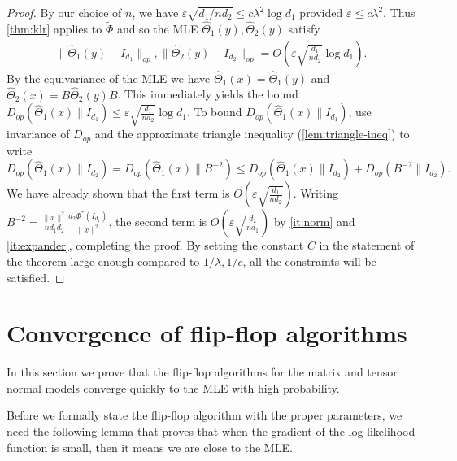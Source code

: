 \documentclass[aos]{imsart}
\theoremstyle{definition}
\numberwithin{equation}{section}
\newcommand{\htheta}{\widehat{\Theta}}
\newcommand{\eps}{\varepsilon}
\begin{document}
\begin{proof}
By our choice of $n$, we have $\eps \sqrt{d_1/nd_2} \leq c\lambda^2\log d_1$ provided $\eps \leq c\lambda^2$. Thus \cref{thm:klr} applies to $\tilde{\Phi}$ and so the MLE $\htheta_1(y), \htheta_2(y)$ satisfy
\begin{gather*} \| \htheta_1(y) - I_{d_1}\|_{op}, \| \htheta_2(y) - I_{d_2}\|_{op} = O\left(\eps \sqrt{\frac{d_1}{n d_2}} \log d_1\right).\end{gather*}
By the equivariance of the MLE we have $\htheta_1(x) = \htheta_1(y)$ and $\htheta_2(x) = B \htheta_2 (y) B$. This immediately yields the bound $ D_{op}(\htheta_1(x) \rVert I_{d_1}) \leq \eps \sqrt{\frac{d_1}{n d_2}} \log d_1.$
To bound $D_{op}(\htheta_1(x) \rVert I_{d_1})$, use invariance of $D_{op}$ and the approximate triangle inequality (\cref{lem:triangle-ineq}) to write
$$D_{op}(\htheta_1(x) \rVert I_{d_2}) = D_{op}(\htheta_1(x) \rVert B^{-2}) \leq D_{op}(\htheta_1(x)\rVert I_{d_2}) + D_{op}(B^{-2}\rVert I_{d_2}).$$
We have already shown that the first term is $O(\eps \sqrt{\frac{d_1}{n d_2}}).$ Writing $B^{-2} = \frac{\|x\|^2}{nd_1 d_2} \frac{d_2 \Phi^*(I_{d_1})}{\|x\|^2}$, the second term is $O(\eps \sqrt{\frac{d_2}{n d_1}})$ by \cref{it:norm} and \cref{it:expander}, completing the proof.  By setting the constant $C$ in the statement of the theorem large enough compared to $1/\lambda, 1/c$, all the constraints will be satisfied.
\end{proof}










\section{Convergence of flip-flop algorithms}

In this section we prove that the flip-flop algorithms for the matrix and tensor normal models converge quickly to the MLE with high probability. 

Before we formally state the flip-flop algorithm with the proper parameters, we need the following lemma that proves that when the gradient of the log-likelihood function is small, then it means we are close to the MLE.
\end{document}
